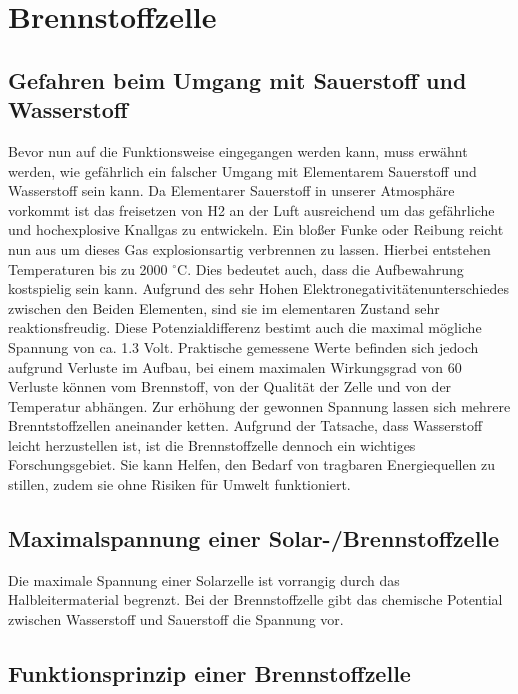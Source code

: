 
\section{Brennstoffzelle}

\subsection*{Gefahren beim Umgang mit Sauerstoff und Wasserstoff}

Bevor nun auf die Funktionsweise eingegangen werden kann, muss erwähnt werden, wie gefährlich ein falscher Umgang mit Elementarem Sauerstoff und Wasserstoff sein kann.
Da Elementarer Sauerstoff in unserer Atmosphäre vorkommt ist das freisetzen von H2 an der Luft ausreichend um das gefährliche und hochexplosive Knallgas zu entwickeln. Ein bloßer Funke oder Reibung reicht nun aus um dieses Gas explosionsartig verbrennen zu lassen.
Hierbei entstehen Temperaturen bis zu 2000 $^\circ$C.
Dies bedeutet auch, dass die Aufbewahrung kostspielig sein kann.
Aufgrund des sehr Hohen Elektronegativitätenunterschiedes zwischen den Beiden Elementen, sind sie im elementaren Zustand sehr reaktionsfreudig. Diese Potenzialdifferenz bestimt auch die maximal mögliche Spannung von ca. 1.3 Volt.
Praktische gemessene Werte befinden sich jedoch aufgrund Verluste im Aufbau, bei einem maximalen Wirkungsgrad von 60%
Verluste können vom Brennstoff, von der Qualität der Zelle und von der Temperatur abhängen.
Zur erhöhung der gewonnen Spannung lassen sich mehrere Brenntstoffzellen aneinander ketten.
Aufgrund der Tatsache, dass Wasserstoff leicht herzustellen ist, ist die Brennstoffzelle dennoch ein wichtiges Forschungsgebiet.
Sie kann Helfen, den Bedarf von tragbaren Energiequellen zu stillen, zudem sie ohne Risiken für Umwelt funktioniert.




\subsection*{Maximalspannung einer Solar-/Brennstoffzelle}
Die maximale Spannung einer Solarzelle ist vorrangig durch das Halbleitermaterial begrenzt. Bei der Brennstoffzelle gibt das chemische Potential zwischen Wasserstoff und Sauerstoff die Spannung vor.

\subsection*{Funktionsprinzip einer Brennstoffzelle}


